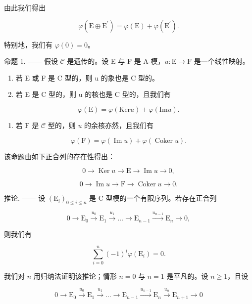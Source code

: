 由此我们得出

\[
\varphi (\mathrm{E} \oplus \mathrm{E} ^ {\prime}) = \varphi (\mathrm{E}) + \varphi (\mathrm{E} ^ {\prime}).\tag{1}
\]

特别地，我们有 \(\varphi(0) = 0\)。

命题 1. —— 假设 \(\mathcal{C}\) 是遗传的。设 E 与 F 是 A-模，\(u: \mathrm{E} \to \mathrm{F}\) 是一个线性映射。

\begin{enumerate}
\def\labelenumi{\alph{enumi})}
\item
  若 E 或 F 是 C 型的，则 u 的象也是 C 型的。
\item
  若 E 是 C 型的，则 u 的核也是 C 型的，且我们有
\end{enumerate}

\[
\varphi (\mathrm{E}) = \varphi (\mathrm{Ker} u) + \varphi (\mathrm{Im} u).\tag{2}
\]

\begin{enumerate}
\def\labelenumi{\alph{enumi})}
\setcounter{enumi}{2}
\tightlist
\item
  若 \(\mathrm{F}\) 是 \(\mathcal{C}\) 型的，则 \(u\) 的余核亦然，且我们有
\end{enumerate}

\[
\varphi (\mathrm{F}) = \varphi (\operatorname{Im} u) + \varphi (\operatorname{Coker} u).\tag{3}
\]

该命题由如下正合列的存在性得出：

\[
0 \longrightarrow \operatorname{Ker} u \longrightarrow \mathrm{E} \longrightarrow \operatorname{Im} u \longrightarrow 0,
\]

\[
0 \longrightarrow \operatorname{Im} u \longrightarrow \mathrm{F} \longrightarrow \operatorname{Coker} u \longrightarrow 0.
\]

推论. —— 设 \((\mathrm{E}_{i})_{0\leqslant i\leqslant n}\) 是 C 型模的一个有限序列。若存在正合列

\[
0 \longrightarrow \mathrm{E} _ {0} \stackrel {u _ {0}} {\longrightarrow} \mathrm{E} _ {1} \stackrel {u _ {1}} {\longrightarrow} \dots \longrightarrow \mathrm{E} _ {n - 1} \stackrel {u _ {n - 1}} {\longrightarrow} \mathrm{E} _ {n} \longrightarrow 0,
\]

则我们有

\[
\sum_ {i = 0} ^ {n} (- 1) ^ {i} \varphi (\mathrm{E} _ {i}) = 0.\tag{4}
\]

我们对 \(n\) 用归纳法证明该推论；情形 \(n = 0\) 与 \(n = 1\) 是平凡的。设 \(n \geqslant 1\)，且设

\[
0 \longrightarrow \mathrm{E} _ {0} \stackrel {u _ {0}} {\longrightarrow} \mathrm{E} _ {1} \stackrel {u _ {1}} {\longrightarrow} \dots \longrightarrow \mathrm{E} _ {n - 1} \stackrel {u _ {n - 1}} {\longrightarrow} \mathrm{E} _ {n} \stackrel {u _ {n}} {\longrightarrow} \mathrm{E} _ {n + 1} \longrightarrow 0
\]

